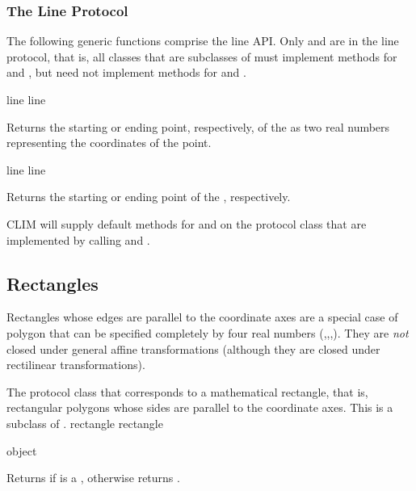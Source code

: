 \subsubsection {The Line Protocol}

The following generic functions comprise the line API.  Only
 and  are in the line protocol, that
is, all classes that are subclasses of  must implement methods for
 and , but need not implement methods
for  and .

 {line}
   {line}

Returns the starting or ending point, respectively, of the 
 as two real numbers representing the coordinates of the point.

 {line}
   {line}

Returns the starting or ending point of the  ,
respectively.

CLIM will supply default methods for  and
 on the protocol class  that are implemented by
calling  and .


\subsection {Rectangles} 
\label {rect}

Rectangles whose edges are parallel to the coordinate axes are a special case of
polygon that can be specified completely by four real numbers
(,,,).  They are {\sl not} closed under general
affine transformations (although they are closed under rectilinear
transformations).


The protocol class that corresponds to a mathematical rectangle, that is,
rectangular polygons whose sides are parallel to the coordinate axes.  This is a
subclass of .
 {rectangle} {rectangle}

 {object}

Returns  if  is a , otherwise returns
.



